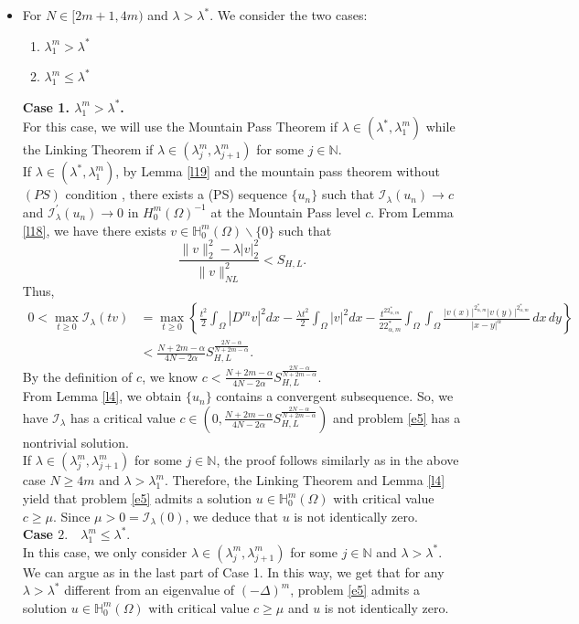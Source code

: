 \documentclass[reqno]{amsart}
\newcommand{\la} {\lambda}
\newcommand{\Om}{\Omega}
\newcommand{\al} {\alpha}
\newcommand{\mb} {\mathbb}
\newcommand{\mc} {\mathcal}
\numberwithin{theorem}{section} \numberwithin{equation}{section}
\begin{document}
\begin{itemize}
\item For $N\in[2m+1,4m)$ and $\la>\la^*$. We consider the two cases: 
\begin{enumerate}
\item $\la^m_1>\la^*$
\item $\la^m_1\leq\la^*$
\end{enumerate} 
{\bf{Case 1. $\la^m_1>\la^*$.}}\\
For this case, we will use the Mountain Pass Theorem if $\la \in\left(\la^*, \la^m_1\right)$ while the Linking Theorem if $\la \in\left(\la^m_j, \la^m_{j+1}\right)$ for some $j \in \mb{N}$.\\
If $\la \in (\la^*, \la^m_1)$, by Lemma \ref{l19} and the mountain pass theorem without $(PS)$ condition \cite{4willem1996minimax}, there exists a (PS) sequence $\{u_n\}$ such that $\mc{I}_\la(u_n) \to c$ and $\mc{I}_\la^{\prime}(u_n) \to  0$ in $H_0^m(\Om)^{-1}$ at the Mountain Pass level $c$. From Lemma \ref{l18}, we have there exists $v \in \mb{H}_0^m(\Om) \backslash\{0\}$ such that
\[\frac{\|v\|_2^2-\la|v|_2^2}{\|v\|_{N L}^2}<S_{H, L}.\]
Thus,
\begin{align*}
0<\max _{t \geq 0} \mc{I}_\la(t v) & =\max _{t \geq 0}\left\{\frac{t^2}{2} \int_{\Om}|D^m v|^2 d x-\frac{\la t^2}{2} \int_{\Om} |v|^2 d x-\frac{t^{22_{\al, m}^*}}{22_{\al, m}^*} \int_{\Om} \int_{\Om} \frac{|v(x)|^{2_{\al, m}^*}|v(y)|^{2_{\al, m}^*}}{|x-y|^\al} \, dx \, dy\right\} \\
& <\frac{N+2m-\al}{4N-2\al}S_{H, L}^{\frac{2N-\al}{N+2m-\al}}.
\end{align*}
By the definition of $c$, we know $c<\frac{N+2m-\al}{4N-2\al}S_{H, L}^{\frac{2N-\al}{N+2m-\al}}$.\\
From Lemma \ref{l4}, we obtain $\{u_n\}$ contains a convergent subsequence. So, we have $\mc{I}_\la$ has a critical value $c\in\left(0,\frac{N+2m-\al}{4N-2\al}S_{H, L}^{\frac{2N-\al}{N+2m-\al}}\right)$ and problem \eqref{e5} has a nontrivial solution.\\
If $\la \in (\la^m_j, \la^m_{j+1})$ for some $j \in \mb{N}$, the proof follows similarly as in the above case $N\geq4m$ and $\la>\la^m_1$.
Therefore, the Linking Theorem and Lemma \ref{l4}
yield that problem \eqref{e5} admits a solution $u \in \mb{H}_0^m(\Om)$ with critical value $c \geq \mu$. Since $\mu>0=\mc{I}_\la(0)$, we deduce that $u$ is not identically zero.\\
{\bf{Case $2. \quad\la^m_1 \leq\la^*$}}.\\
In this case, we only consider $\la \in (\la^m_j, \la^m_{j+1})$ for some $j \in \mb{N}$ and $\la>\la^*$. We can argue as in the last part of Case 1. In this way, we get that for any $\la>\la^*$ different from an eigenvalue of $(-\Delta)^m$, problem \eqref{e5} admits a solution $u \in \mb{H}_0^m(\Om)$ with critical value $c\geq \mu$ and $u$ is not identically zero.\\
\end{itemize}
\end{document}
